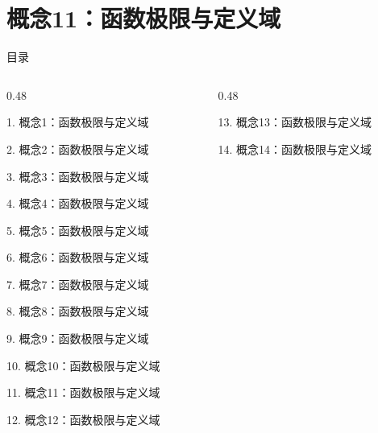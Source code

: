 \documentclass[aspectratio=169,10pt,fontset=fandol]{ctexbeamer}
\begin{document}
\section{概念11：函数极限与定义域}
\begin{frame}[t,fragile]{目录}
\small
\begin{columns}[T,onlytextwidth]
\begin{column}{0.48\textwidth}
{\color{black}\small 1. 概念1：函数极限与定义域\par}\vspace{0.22em}
{\color{black}\small 2. 概念2：函数极限与定义域\par}\vspace{0.22em}
{\color{black}\small 3. 概念3：函数极限与定义域\par}\vspace{0.22em}
{\color{black}\small 4. 概念4：函数极限与定义域\par}\vspace{0.22em}
{\color{black}\small 5. 概念5：函数极限与定义域\par}\vspace{0.22em}
{\color{black}\small 6. 概念6：函数极限与定义域\par}\vspace{0.22em}
{\color{black}\small 7. 概念7：函数极限与定义域\par}\vspace{0.22em}
{\color{black}\small 8. 概念8：函数极限与定义域\par}\vspace{0.22em}
{\color{black}\small 9. 概念9：函数极限与定义域\par}\vspace{0.22em}
{\color{black}\small 10. 概念10：函数极限与定义域\par}\vspace{0.22em}
{\color{blue}\small 11. 概念11：函数极限与定义域\par}\vspace{0.22em}
{\color{gray!40}\small 12. 概念12：函数极限与定义域\par}\vspace{0.22em}
\end{column}
\begin{column}{0.48\textwidth}
{\color{gray!40}\small 13. 概念13：函数极限与定义域\par}\vspace{0.22em}
{\color{gray!40}\small 14. 概念14：函数极限与定义域\par}\vspace{0.22em}

\end{column}
\end{columns}
\end{frame}
\end{document}
